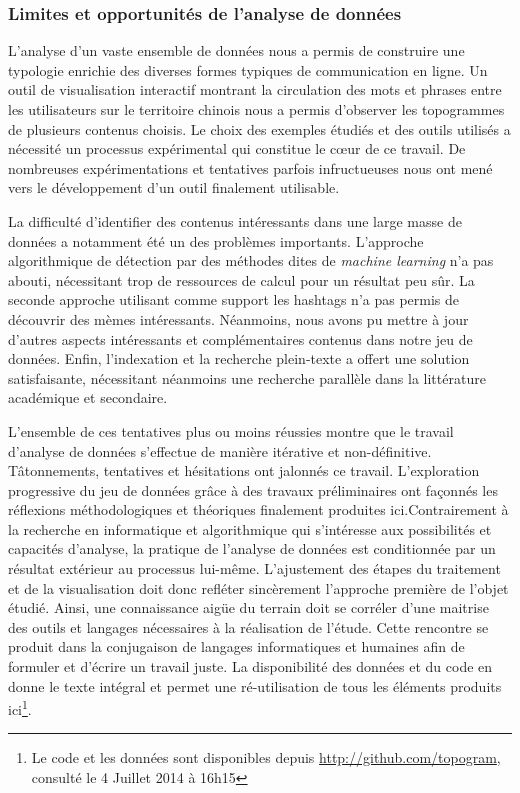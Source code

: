 \subsubsection{Limites et opportunités de l'analyse de données}

L'analyse d'un vaste ensemble de données nous a permis de construire une typologie enrichie des diverses formes typiques de communication en ligne. Un outil de visualisation interactif montrant la circulation des mots et phrases entre les utilisateurs sur le territoire chinois nous a permis d'observer les topogrammes de plusieurs contenus choisis. Le choix des exemples étudiés et des outils utilisés a  nécessité un processus expérimental qui constitue le cœur de ce travail. De nombreuses expérimentations et tentatives parfois infructueuses nous ont mené vers le développement d'un outil finalement utilisable.

La difficulté d'identifier des contenus intéressants dans une large masse de données a notamment été un des problèmes importants. L'approche algorithmique de détection par des méthodes dites de \textit{machine learning} n'a pas abouti, nécessitant trop de ressources de calcul pour un résultat peu sûr. La seconde approche utilisant comme support les hashtags n'a pas permis de découvrir des mèmes intéressants. Néanmoins, nous avons pu mettre à jour d'autres aspects intéressants et complémentaires contenus dans notre jeu de données. Enfin, l'indexation et la recherche plein-texte a offert une solution satisfaisante, nécessitant néanmoins une recherche parallèle dans la littérature académique et secondaire.

L'ensemble de ces tentatives plus ou moins réussies montre que le travail d'analyse de données s'effectue de manière itérative et non-définitive. Tâtonnements, tentatives et hésitations ont jalonnés ce travail. L'exploration progressive du jeu de données grâce à des travaux préliminaires ont façonnés les réflexions méthodologiques et théoriques finalement produites ici.Contrairement à la recherche en informatique et algorithmique qui s'intéresse aux possibilités et capacités d'analyse, la pratique de l'analyse de données est conditionnée par un résultat extérieur au processus lui-même. L'ajustement des étapes du traitement et de la visualisation doit donc refléter sincèrement l'approche première de l'objet étudié. Ainsi, une connaissance aigüe du terrain doit se corréler d'une maitrise des outils et langages nécessaires à la réalisation de l'étude. Cette rencontre se produit dans la conjugaison de langages informatiques et humaines afin de formuler et d'écrire un travail juste. La disponibilité des données et du code en donne le texte intégral et permet une ré-utilisation de tous les éléments produits ici\footnote{Le code et les données sont disponibles depuis \url{http://github.com/topogram}, consulté le 4 Juillet 2014 à 16h15}. 

